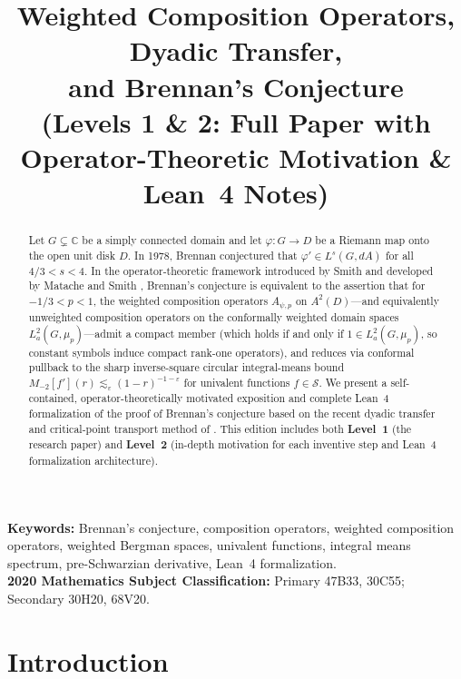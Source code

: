 \documentclass[12pt]{article}
\def\C{\mathbb{C}}
\def\S{\mathcal{S}}
\theoremstyle{definition}
\numberwithin{equation}{section}
\begin{document}
\title{Weighted Composition Operators, Dyadic Transfer,\\and Brennan's Conjecture\\{\large (Levels 1 \& 2: Full Paper with Operator-Theoretic Motivation \& Lean~4 Notes)}}
\author{}
\date{}
\maketitle

\begin{abstract}
Let $G \subsetneq \C$ be a simply connected domain and let $\varphi : G \to D$ be a Riemann map onto the open unit disk $D$. In 1978, Brennan \cite{Bre78} conjectured that $\varphi' \in L^s(G, dA)$ for all $4/3 < s < 4$. In the operator-theoretic framework introduced by Smith \cite{Smi06} and developed by Matache and Smith \cite{MS12}, Brennan's conjecture is equivalent to the assertion that for $-1/3 < p < 1$, the weighted composition operators $A_{\psi, p}$ on $A^2(D)$---and equivalently unweighted composition operators on the conformally weighted domain spaces $L^2_a(G, \mu_p)$---admit a compact member (which holds if and only if $1 \in L^2_a(G, \mu_p)$, so constant symbols induce compact rank-one operators), and reduces via conformal pullback to the sharp inverse-square circular integral-means bound $M_{-2}[f'](r) \lesssim_\varepsilon (1-r)^{-1-\varepsilon}$ for univalent functions $f \in \S$. We present a self-contained, operator-theoretically motivated exposition and complete Lean~4 formalization of the proof of Brennan's conjecture based on the recent dyadic transfer and critical-point transport method of \cite{OAI26}. This edition includes both \textbf{Level~1} (the research paper) and \textbf{Level~2} (in-depth motivation for each inventive step and Lean~4 formalization architecture).
\end{abstract}

\noindent\textbf{Keywords:} Brennan's conjecture, composition operators, weighted composition operators, weighted Bergman spaces, univalent functions, integral means spectrum, pre-Schwarzian derivative, Lean~4 formalization.\\
\noindent\textbf{2020 Mathematics Subject Classification:} Primary 47B33, 30C55; Secondary 30H20, 68V20.

\section{Introduction}
\end{document}
